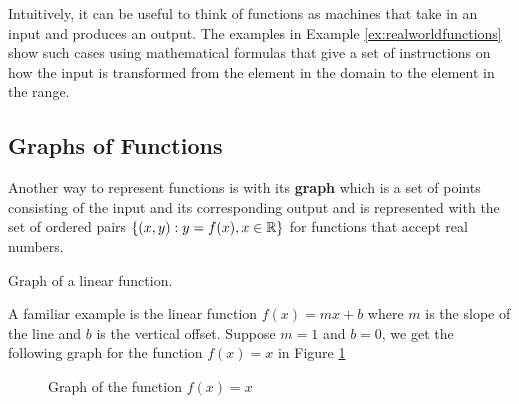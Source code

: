 Intuitively, it can be useful to think of functions as machines that take in an input and produces an output. The examples in Example \ref{ex:realworldfunctions} show such cases using mathematical formulas that give a set of instructions on how the input is transformed from the element in the domain to the element in the range.

\subsection{Graphs of Functions}

Another way to represent functions is with its \textbf{graph} which is a set of points consisting of the input and its corresponding output and is represented with the set of ordered pairs $\{(x,y) : y = f(x), x\in\mathbb{R}\}$ for functions that accept real numbers.

\begin{example} Graph of a linear function.

    A familiar example is the linear function $f(x) = mx + b$ where $m$ is the slope of the line and $b$ is the vertical offset. Suppose $m = 1$ and $b = 0$, we get the following graph for the function $f(x) = x$ in Figure \ref{f(x)=x graph}
    \begin{figure}[!ht]
        \centering
        \label{f(x)=x graph}
        \caption{Graph of the function $f(x) = x$}
    \end{figure}
\end{example}

